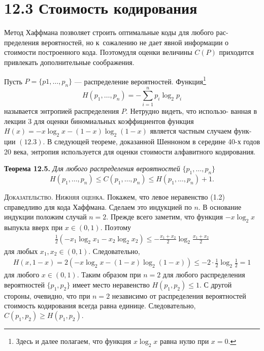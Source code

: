 \documentclass[12pt]{article}
\numberwithin{equation}{section}
\begin{document}
\section*{12.3 Стоимость кодирования}
Метод Хаффмана позволяет строить оптимальные коды для любого рас-
пределения вероятностей, но к~сожалению не дает явной информации о
стоимости построенного кода. Поэтомудля оценки величины $C(P)$ приходится привлекать дополнительные соображения.

Пусть $P=\{p1,\dots,p_n\}$ — распределение вероятностей. Функция\footnote{Здесь и далее полагаем, что функция $x \log_2 x$ равна нулю при $x = 0$.}
\begin{equation}
H(p_1,\dots,p_n)=-\sum_{i=1}^{n}
p_i\log_{2}p_i
\end{equation}
называется энтропией распределения $P$. Нетрудно видеть, что использо-
ванная в лекции 3 для оценки биномиальных коэффициентов функция
$H(x) =-x\log_2x-(1-x)\log_2(1-x) $ является частным случаем функ-
ции $(12.3)$. В следующей теореме, доказанной Шенноном в середине 40-х
годов 20 века, энтропия используется для оценки стоимости алфавитного
кодирования.

\textbf{Теорема 12.5.} \textit{Для любого распределения вероятностей}
$\{p_1,\dots,p_n\}$
\begin{equation}
H(p_1,\dots,p_n)\le C(p_1,\dots,p_n)\le H(p_1,\dots,p_n)+1.
\end{equation}

\textsc{Доказательство. Нижняя оценка.} Покажем, что левое неравенство
(1.2) справедливо для кода Хаффмана. Сделаем это индукцией по
$n$. В основание индукции положим случай $n = 2$. Прежде всего заметим, что функция
$-x \log_2 x$ выпукла вверх при $x\in(0,1)$. Поэтому
\begin{align*}
\frac{1}{2}(-x_1\log_2x_1-x_2\log_2x_2)\le -\frac{x_1+x_2}{2}\log_2
\frac{x_1+x_2}{2}
\end{align*}
для любых $x_1, x_2 \in(0, 1)$. Следовательно,\\
\begin{align*}
H(x,1-x)=2(-x\log_2x-(1-x)\log_2(1-x))\le
-2\cdot\frac{1}{2}\log_2\frac{1}{2}=1
\end{align*}
для любого $x\in(0, 1)$. Таким образом при $n = 2$ для любого распределения вероятностей $\{p_1, p_2\}$ имеет место неравенство $H(p_1, p_2)\le 1.$ С другой стороны, очевидно, что при $n = 2$ независимо от распределения вероятностей стоимость кодирования всегда равна единице. Следовательно,
$C(p_1, p_2) \ge H(p_1, p_2).$
\end{document}
